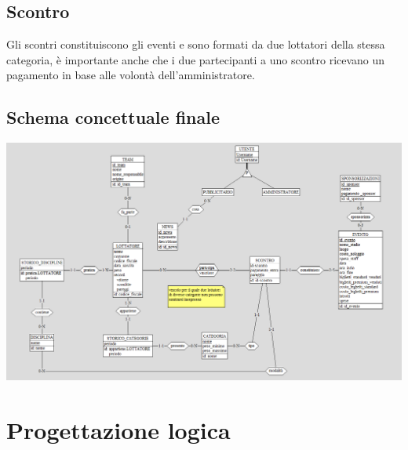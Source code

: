 \documentclass[a4paper,12pt]{report}
\begin{document}
\section{Scontro}
Gli scontri constituiscono gli eventi e sono formati da due lottatori della stessa categoria, è importante anche che i due partecipanti 
a uno scontro ricevano un pagamento in base alle volontà dell'amministratore.

\section{Schema concettuale finale}
\includegraphics[scale=0.65, angle=90]{./img/schema_finale.png}

\chapter{Progettazione logica}
\end{document}
